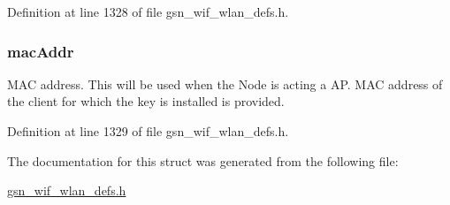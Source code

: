 Definition at line 1328 of file gsn\_\-wif\_\-wlan\_\-defs.h.

\hypertarget{a00387_ab623c15c7dc79be51bcdaa04fba67d90}{
\subsubsection[{macAddr}]{ {\bf macAddr}}}
\label{a00387_ab623c15c7dc79be51bcdaa04fba67d90}
MAC address. This will be used when the Node is acting a AP. MAC address of the client for which the key is installed is provided. 

Definition at line 1329 of file gsn\_\-wif\_\-wlan\_\-defs.h.



The documentation for this struct was generated from the following file:\begin{DoxyCompactItemize}
\item 
\hyperlink{a00613}{gsn\_\-wif\_\-wlan\_\-defs.h}\end{DoxyCompactItemize}
